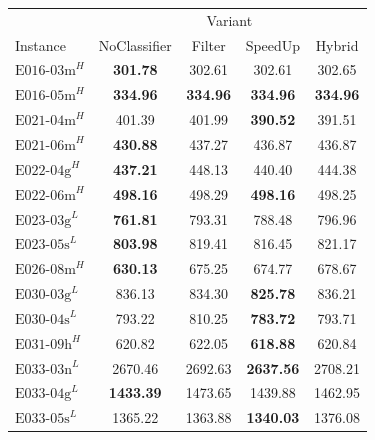 \begin{table}
	\centering
	\renewcommand{\arraystretch}{1.05}
	\begin{tabular}{lcccc}
		\toprule
		                    & \multicolumn{4}{c}{Variant}                                                        \\\cline{2-5}
		Instance            & NoClassifier                & Filter          & SpeedUp          & Hybrid          \\
		\midrule
		$\text{E016-03m}^H$ & \textbf{301.78  }           & 302.61          & 302.61           & 302.65          \\
		$\text{E016-05m}^H$ & \textbf{334.96 }            & \textbf{334.96} & \textbf{334.96}  & \textbf{334.96} \\
		$\text{E021-04m}^H$ & 401.39                      & 401.99          & \textbf{390.52}  & 391.51          \\
		$\text{E021-06m}^H$ & \textbf{430.88 }            & 437.27          & 436.87           & 436.87          \\
		$\text{E022-04g}^H$ & \textbf{437.21 }            & 448.13          & 440.40           & 444.38          \\
		$\text{E022-06m}^H$ & \textbf{498.16 }            & 498.29          & \textbf{498.16}  & 498.25          \\
		$\text{E023-03g}^L$ & \textbf{761.81 }            & 793.31          & 788.48           & 796.96          \\
		$\text{E023-05s}^L$ & \textbf{803.98 }            & 819.41          & 816.45           & 821.17          \\
		$\text{E026-08m}^H$ & \textbf{630.13 }            & 675.25          & 674.77           & 678.67          \\
		$\text{E030-03g}^L$ & 836.13                      & 834.30          & \textbf{825.78}  & 836.21          \\
		$\text{E030-04s}^L$ & 793.22                      & 810.25          & \textbf{783.72}  & 793.71          \\
		$\text{E031-09h}^H$ & 620.82                      & 622.05          & \textbf{618.88}  & 620.84          \\
		$\text{E033-03n}^L$ & 2670.46                     & 2692.63         & \textbf{2637.56} & 2708.21         \\
		$\text{E033-04g}^L$ & \textbf{1433.39}            & 1473.65         & 1439.88          & 1462.95         \\
		$\text{E033-05s}^L$ & 1365.22                     & 1363.88         & \textbf{1340.03} & 1376.08         \\

\end{tabular}
\end{table}
